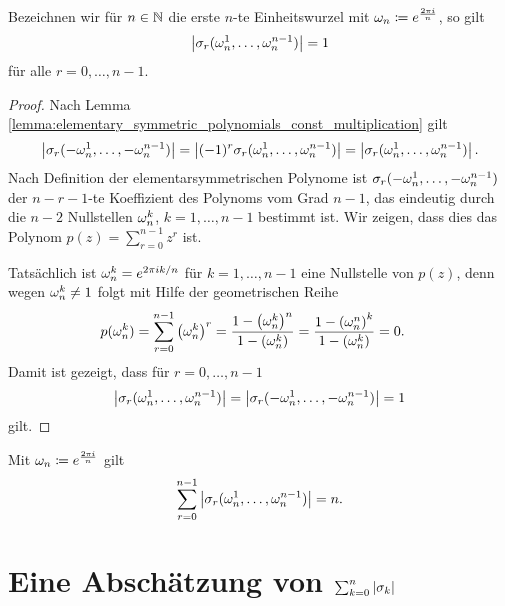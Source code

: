 \begin{lemma}
    \label{lemma:outlier_sigma_zero}
    Bezeichnen wir für $n \in \mathbb{N}$ die erste $n$-te Einheitswurzel mit
    $\omega_n \coloneqq e^{\frac{2 \pi i}{n}}$, so gilt
    \begin{equation}
        \label{eq:outlier_sigma_zero}
        \left\lvert \sigma_r(\omega_n^1, \dots, \omega_n^{n-1}) \right\rvert = 1
    \end{equation}
    für alle $r = 0, \dots, n-1$.
\end{lemma}
\begin{proof}
    Nach Lemma \ref{lemma:elementary_symmetric_polynomials_const_multiplication}
    gilt
    \[
        \left\lvert \sigma_r(-\omega_n^1, \dots, -\omega_n^{n-1}) \right\rvert
        = \left\lvert (-1)^r \sigma_r(\omega_n^1, \dots, \omega_n^{n-1}) \right\rvert
        = \left\lvert \sigma_r(\omega_n^1, \dots, \omega_n^{n-1}) \right\rvert.
    \]
    Nach Definition der elementarsymmetrischen Polynome ist
    $\sigma_r({-\omega_n^1, \dots, -\omega_n^{n-1}})$
    der ${n\!-\!r\!-\!1}$-te Koeffizient des Polynoms vom
    Grad $n-1$, das eindeutig durch die $n-2$ Nullstellen
    $\omega_n^k$, $k=1, \dots, n-1$ bestimmt ist.
    Wir zeigen, dass dies das Polynom $p(z) = \sum_{r=0}^{n-1} z^r$ ist.

    \noindent Tatsächlich ist $\omega_n^k = e^{2 \pi i k / n}$ für $k = 1, \dots, n-1$
    eine Nullstelle von $p(z)$, denn wegen $\omega_n^k \neq 1$ folgt mit Hilfe der
    geometrischen Reihe
    \[
        \begin{split}
            p(\omega_n^k)
            &= \sum_{r=0}^{n-1} \left( \omega_n^k \right)^r
            = \frac{1 - \left( \omega_n^k \right)^n}{1 - \left( \omega_n^k \right)}
            = \frac{1 - \left( \omega_n^n \right)^k}{1 - \left( \omega_n^k \right)}
            = 0.
        \end{split}
    \]
    Damit ist gezeigt, dass für $r=0, \dots, n-1$
    \[
        \left\lvert \sigma_r(\omega_n^1, \dots, \omega_n^{n-1}) \right\rvert
        = \left\lvert \sigma_r(-\omega_n^1, \dots, -\omega_n^{n-1}) \right\rvert
        = 1
    \]
    gilt.
\end{proof}

\begin{corollary}
    \label{corollary:outlier_sigma_zero_row_sum}
    Mit $\omega_n \coloneqq e^{\frac{2 \pi i}{n}}$ gilt
    \begin{equation}
        \label{eq:outlier_sigma_zero_row_sum}
        \sum_{r=0}^{n-1} \left\lvert \sigma_r(\omega_n^1, \dots, \omega_n^{n-1}) \right\rvert = n.
    \end{equation}
\end{corollary}

\section[Abschätzung der Betragssumme der elementarsymmetrischen Polynome]{Eine Abschätzung von \boldmath $\sum_{k=0}^{n} \left\lvert \sigma_{k} \right\rvert$}

